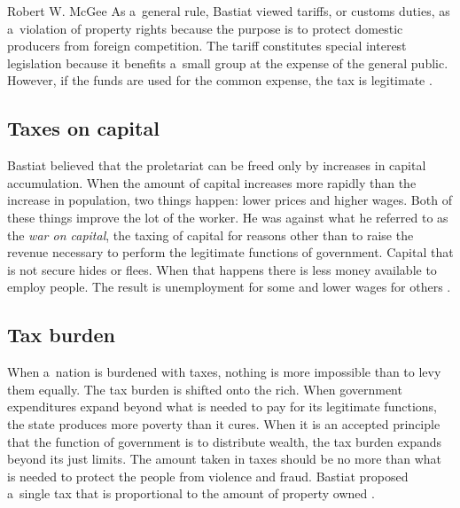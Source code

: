 \begin{artengenv}{Robert W. McGee}
As a~general rule, Bastiat viewed tariffs, or customs duties, as a~violation of property rights because the purpose is to protect domestic producers from foreign competition. The tariff constitutes special interest legislation because it benefits a~small group at the expense of the general public. However, if the funds are used for the common expense, the tax is legitimate 
\parencite[][pp.111–112]{bastiat_selected_1964}.%




\subsection{Taxes on capital}



Bastiat believed that the proletariat can be freed only by increases in capital accumulation. When the amount of capital increases more rapidly than the increase in population, two things happen: lower prices and higher wages. Both of these things improve the lot of the worker. He was against what he referred to as the \textit{war on capital}, the taxing of capital for reasons other than to raise the revenue necessary to perform the legitimate functions of government. Capital that is not secure hides or flees. When that happens there is less money available to employ people. The result is unemployment for some and lower wages for others 
\parencite[][pp.184–185]{bastiat_selected_1964}.%




\subsection{Tax burden}



When a~nation is burdened with taxes, nothing is more impossible than to levy them equally. The tax burden is shifted onto the rich. When government expenditures expand beyond what is needed to pay for its legitimate functions, the state produces more poverty than it cures. When it is an accepted principle that the function of government is to distribute wealth, the tax burden expands beyond its just limits. The amount taken in taxes should be no more than what is needed to protect the people from violence and fraud. Bastiat proposed a~single tax that is proportional to the amount of property owned 
\parencite[][pp.125–126]{bastiat_selected_1964}.%





\end{artengenv}
